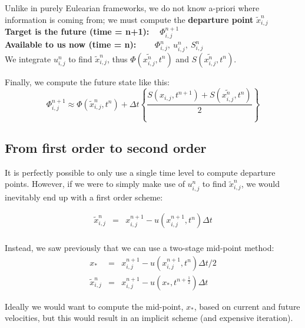 			Unlike in purely Eulearian frameworks, we do not know a-priori where information is coming from; we must compute the \textbf{departure point} $\tilde{x}^n_{i,j}$\\
			
			
			{\bf Target is the future (time = n+1): ~ }  $\Phi^{n+1}_{i,j}$ \\
			{\bf Available to us now (time = n):  ~ ~ }  $\Phi^n_{i,j}, ~ u^n_{i,j}, ~ S^n_{i,j}$ \\
			
			We integrate ${u}^n_{i,j}$ to find $\tilde{x}^n_{i,j}$, thus $\Phi (\tilde{x_{i,j}^n},t^{n})$ and $S(\tilde{x_{i,j}^n},t^{n})$.
			
			Finally, we compute the future state like this: 
\begin{equation}
			\Phi^{n+1}_{i,j}  \approx  \Phi(\tilde{x}^n_{i,j}, t^n) 
			+ \Delta t \left\{ \frac{S(x_{i,j},t^{n+1}) + S (\tilde{x_{i,j}^n},t^{n})}{2}\right\} 
\end{equation}



\subsection{From first order to second order}

	
	It is perfectly possible to only use a single time level to compute departure points. However, if we were to simply make use of $u^n_{i,j}$ to find $\tilde{x}^n_{i,j}$, we would inevitably end up with a first order scheme:
	
	\begin{eqnarray*}
		\tilde{x}^n_{i,j} & = & x^{n+1}_{i,j}-u(x^{n+1}_{i,j},t^n) \Delta t \\
	\end{eqnarray*}
		
	Instead, we saw previously that we can use a two-stage mid-point method:
	\begin{eqnarray*}
		x_* & = & x^{n+1}_{i,j}-u(x^{n+1}_{i,j},t^n) \Delta t/2 \\
		\tilde{x}^n_{i,j} & = & x^{n+1}_{i,j}-u(x_*,t^{n+\frac{1}{2}}) \Delta t
	\end{eqnarray*}
	
	Ideally we would want to compute the mid-point, $x_*$, based on current and future velocities, but this would result in an implicit scheme (and expensive iteration).\\
	
